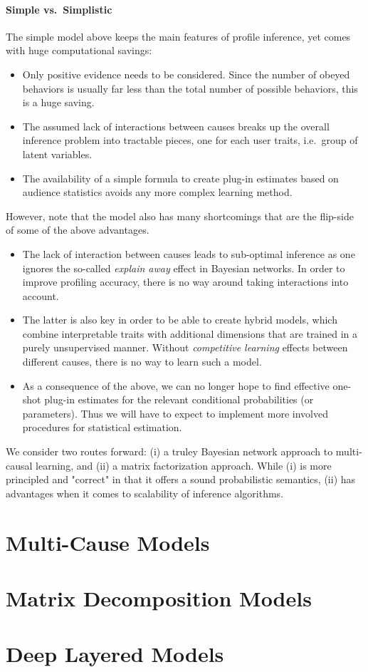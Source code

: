 \documentclass{article}
\begin{document}
\paragraph{Simple vs.~Simplistic}

The simple model above keeps the main features of profile inference, yet comes with huge computational savings: 
\begin{itemize}
\item Only positive evidence needs to be considered. Since the number of obeyed behaviors is usually far less than the total number of possible behaviors, this is a huge saving. 
\item The assumed lack of interactions between causes breaks up the overall inference problem into tractable pieces, one for each user traits, i.e.~group of latent variables. 
\item The availability of a simple formula to create plug-in estimates based on audience statistics avoids any more complex learning method.  
\end{itemize}

However, note that the model also has many shortcomings that are the flip-side of some of the above advantages. 
\begin{itemize}
\item The lack of interaction between causes leads to sub-optimal inference as one ignores the so-called \textit{explain away} effect in Bayesian networks. In order to improve profiling accuracy, there is no way around taking interactions into account.  
\item The latter is also key in order to be able to create hybrid models, which combine interpretable traits with additional dimensions that are trained in a purely unsupervised manner. Without \textit{competitive learning} effects between different causes, there is no way to learn such a model. 
\item As a consequence of the above, we can no longer hope to find effective one-shot plug-in estimates for the relevant conditional probabilities (or parameters).  Thus we will have to expect to implement more involved procedures for statistical estimation. 
\end{itemize}

We consider two routes forward: (i) a truley Bayesian network approach to multi-causal learning,  and (ii) a matrix factorization approach. While (i) is more principled and "correct" in that it offers a sound probabilistic semantics, (ii) has advantages when it comes to scalability of inference algorithms. 

\section{Multi-Cause Models}

\section{Matrix Decomposition Models}

\section{Deep Layered Models}



\end{document}

